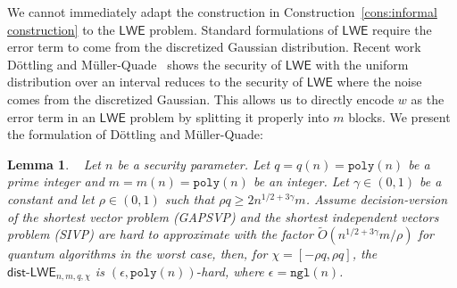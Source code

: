 \documentclass[11pt]{article}
\newcommand{\consref}[1]{\mbox{Construction~\ref{#1}}}
\newcommand{\class}[1]{{\ensuremath{\mathsf{#1}}}}
\newcommand{\rep}{\ensuremath{\class{Rep}}\xspace}
\newcommand{\vect}[1]{\ensuremath{\textbf{#1}}}
\newcommand{\poly}{\ensuremath{\mathtt{poly}}\xspace}
\newcommand{\ngl}{\ensuremath{\mathtt{ngl}}\xspace}
\newcommand{\LWE}{\class{LWE}}
\newcommand{\distLWE}{\ensuremath{\class{dist\mbox{-}LWE}}}
\newtheorem{lemma}[theorem]{Lemma}
\newcommand{\vA}{\vect{A}}
\begin{document}
We cannot immediately adapt the construction in \consref{cons:informal construction} to the $\LWE$ problem.  Standard formulations of $\LWE$ require the error term to come from the discretized Gaussian distribution.  
Recent work D\"{o}ttling and M\"{u}ller-Quade~\cite{dottling2012} shows the security of $\LWE$ with the uniform distribution over an interval reduces to the security of $\LWE$ where the noise comes from the discretized Gaussian.  This allows us to directly encode $w$ as the error term in an $\LWE$ problem by splitting it properly into $m$ blocks.
We present the formulation of D\"{o}ttling and M\"{u}ller-Quade: 

\begin{lemma}~
\label{lem:uniform LWE decision}
Let $n$ be a security parameter.  Let $q = q(n) = \poly(n)$ be a prime integer and $m = m(n) = \poly(n)$ be an integer. Let $\gamma\in (0, 1)$ be a constant and let $\rho\in (0,1)$ such that $\rho q \geq 2n^{1/2+3\gamma}m$. Assume decision-version of the shortest vector problem (GAPSVP) and the shortest independent vectors problem (SIVP) are hard to approximate with the factor $\tilde{O}(n^{1/2+3\gamma}m/\rho)$ for quantum algorithms in the worst case, then, for $\chi = [-\rho q, \rho q]$, the $\distLWE_{n, m, q, \chi}$ is $(\epsilon, \poly(n))\mbox{-}$hard, where $\epsilon = \ngl(n)$.
\end{lemma}
\end{document}

